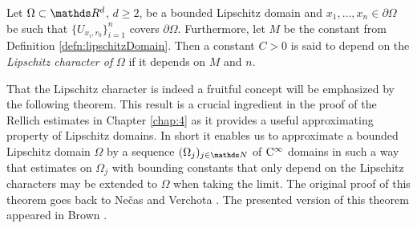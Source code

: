   \begin{defn}
    Let $\Omega \subset \R^d$, $d \geq 2$, be a bounded Lipschitz domain and $x_1, \dots,x_n \in \partial\Omega$ be such that $\{U_{x_i,r_0} \}_{i = 1}^n$ covers $\partial\Omega$.  
    Furthermore, let $M$ be the constant from Definition \ref{defn:lipschitzDomain}.
    Then a constant $C > 0$ is said to depend on the \emph{Lipschitz character of} $\Omega$ if it depends on $M$ and $n$.
  \end{defn}

  That the Lipschitz character is indeed a fruitful concept will be emphasized by the following theorem.
  This result is a crucial ingredient in the proof of the Rellich estimates in Chapter \ref{chap:4} as it provides a useful approximating property of Lipschitz domains. In short it enables us to approximate a bounded Lipschitz domain $\Omega$ by a sequence $(\Omega_j)_{j \in \N}$ of $\mathrm{C}^\infty$ domains in such a way that estimates on $\Omega_j$ with bounding constants that only depend on the Lipschitz characters may be extended to $\Omega$ when taking the limit.
  The original proof of this theorem goes back to Ne\v{c}as \cite{necas} and Verchota \cite{verchota}. 
  The presented version of this theorem appeared in Brown \cite{brown}.

